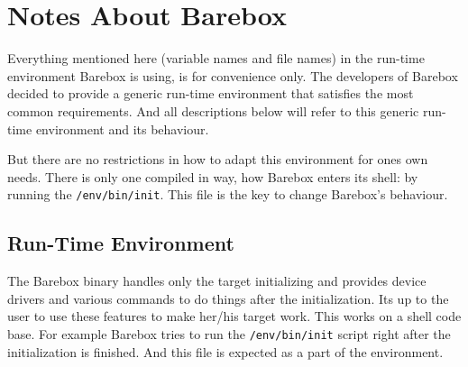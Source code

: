 %
%
%
%
%
%
%

\section{Notes About Barebox}			\label{sec:bareboxnotes}

Everything mentioned here (variable names and file names) in the run-time
environment Barebox is using, is for convenience only. The developers of Barebox
decided to provide a generic run-time environment that satisfies the most
common requirements. And all descriptions below will refer to this generic
run-time environment and its behaviour.

But there are no restrictions in how to adapt this environment for ones own
needs. There is only one compiled in way, how Barebox enters its shell: by
running the \texttt{/env/bin/init}. This file is the key to change Barebox's
behaviour.

%
%

\subsection{Run-Time Environment}			\label{sec:bbenv}

The Barebox binary handles only the target initializing and provides device
drivers and various commands to do things after the initialization. Its up to
the user to use these features to make her/his target work. This works on a
shell code base. For example Barebox tries to run the \texttt{/env/bin/init}
script right after the initialization is finished. And this file is expected
as a part of the environment.

